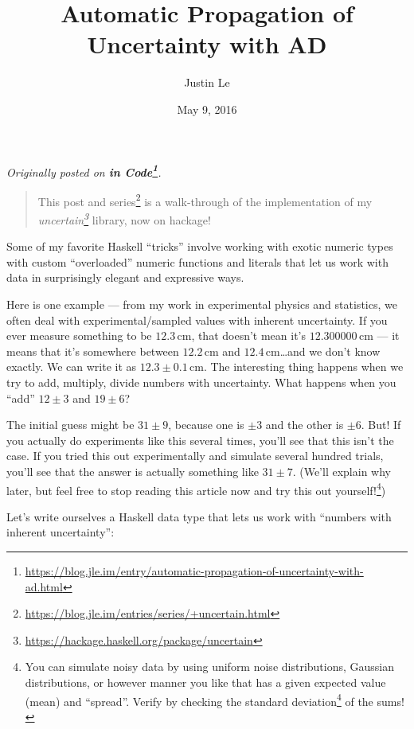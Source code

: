 \documentclass[]{article}
\title{Automatic Propagation of Uncertainty with AD}
\author{Justin Le}
\date{May 9, 2016}
\renewcommand{\href}[2]{#2\footnote{\url{#1}}}
\begin{document}
\maketitle

\emph{Originally posted on
\textbf{\href{https://blog.jle.im/entry/automatic-propagation-of-uncertainty-with-ad.html}{in
Code}}.}

\begin{quote}
This post and \href{https://blog.jle.im/entries/series/+uncertain.html}{series}
is a walk-through of the implementation of my
\emph{\href{https://hackage.haskell.org/package/uncertain}{uncertain}} library,
now on hackage!
\end{quote}

Some of my favorite Haskell ``tricks'' involve working with exotic numeric types
with custom ``overloaded'' numeric functions and literals that let us work with
data in surprisingly elegant and expressive ways.

Here is one example --- from my work in experimental physics and statistics, we
often deal with experimental/sampled values with inherent uncertainty. If you
ever measure something to be \(12.3\,\mathrm{cm}\), that doesn't mean it's
\(12.300000\,\mathrm{cm}\) --- it means that it's somewhere between
\(12.2\,\mathrm{cm}\) and \(12.4\,\mathrm{cm}\)\ldots and we don't know exactly.
We can write it as \(12.3 \pm 0.1\,\mathrm{cm}\). The interesting thing happens
when we try to add, multiply, divide numbers with uncertainty. What happens when
you ``add'' \(12 \pm 3\) and \(19 \pm 6\)?

The initial guess might be \(31 \pm 9\), because one is \(\pm 3\) and the other
is \(\pm 6\). But! If you actually do experiments like this several times,
you'll see that this isn't the case. If you tried this out experimentally and
simulate several hundred trials, you'll see that the answer is actually
something like \(31 \pm 7\). (We'll explain why later, but feel free to stop
reading this article now and try this out yourself!\footnote{You can simulate
  noisy data by using uniform noise distributions, Gaussian distributions, or
  however manner you like that has a given expected value (mean) and ``spread''.
  Verify by checking the
  \href{https://en.wikipedia.org/wiki/Standard_deviation}{standard deviation} of
  the sums!})

Let's write ourselves a Haskell data type that lets us work with ``numbers with
inherent uncertainty'':
\end{document}
